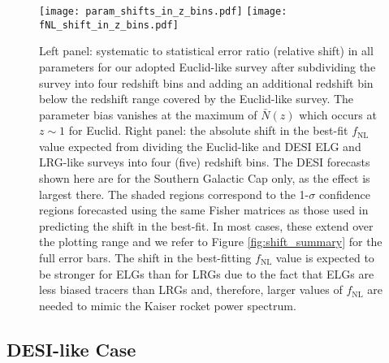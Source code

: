 \documentclass[a4paper,11pt]{article}
\begin{document}
\begin{figure}
    \centering
    \texttt{[image: param\_shifts\_in\_z\_bins.pdf]}
    \texttt{[image: fNL\_shift\_in\_z\_bins.pdf]}
    
    \caption{Left panel: systematic to statistical error ratio (relative shift) in all parameters for our adopted Euclid-like survey after subdividing the survey into four redshift bins and adding an additional redshift bin below the redshift range covered by the Euclid-like survey. The parameter bias vanishes at the maximum of $\bar N(z)$ which occurs at $z\sim 1$ for Euclid. Right panel: the absolute shift in the best-fit $f_\mathrm{NL}$ value expected from dividing the Euclid-like and DESI ELG and LRG-like surveys into four (five) redshift bins. The DESI forecasts shown here are for the Southern Galactic Cap only, as the effect is largest there. The shaded regions correspond to the 1-$\sigma$ confidence regions forecasted using the same Fisher matrices as those used in predicting the shift in the best-fit. In most cases, these extend over the plotting range and we refer to Figure \ref{fig:shift_summary} for the full error bars. The shift in the best-fitting $f_\mathrm{NL}$ value is expected to be stronger for ELGs than for LRGs due to the fact that ELGs are less biased tracers than LRGs and, therefore, larger values of $f_\mathrm{NL}$ are needed to mimic the Kaiser rocket power spectrum.}
    \label{fig:param_shifts_in_z_bins}
\end{figure}

\subsection{DESI-like Case}
\label{DESI}
\end{document}
